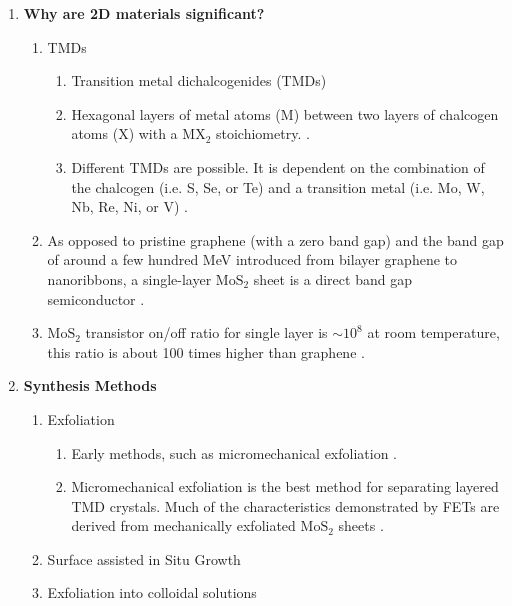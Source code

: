 \documentclass{article}
\begin{document}
\begin{enumerate}
\begin{enumerate}
		\end{enumerate} %
	\item{\textbf{Why are 2D materials significant?}}

		\begin{enumerate} %
			\item{TMDs}
				\begin{enumerate}
					\item{Transition metal dichalcogenides (TMDs)}
					\item{Hexagonal layers of metal atoms ($\mathrm{M}$) between two layers of chalcogen atoms ($\mathrm{X}$) with a $\mathrm{MX}_2$ stoichiometry. \cite{grapheneLike2Dreview2013}.}
					\item{Different TMDs are possible. It is dependent on the combination of the chalcogen (i.e. S, Se, or Te) and a transition metal (i.e. Mo, W, Nb, Re, Ni, or V) \cite{WilsonTMDs1969, grapheneLike2Dreview2013}.}
				\end{enumerate}
	
			\item{As opposed to pristine graphene (with a zero band gap) and the band gap of around a few hundred MeV introduced from bilayer graphene to nanoribbons, a single-layer $\mathrm{MoS}_2$ sheet is a direct band gap semiconductor \cite{grapheneLike2Dreview2013}. }
			\item{$\mathrm{MoS}_2$ transistor on/off ratio for single layer is $\sim 10^8$ at room temperature, this ratio is about 100 times higher than graphene \cite{grapheneLike2Dreview2013, novoselovEtAl2004}.}

		\end{enumerate} %

	\item{\textbf{Synthesis Methods}}
		\begin{enumerate} %
			\item{Exfoliation}
				\begin{enumerate}
					\item{Early methods, such as micromechanical exfoliation \cite{nanoscaleReview2011,acsnanoReview2013}.}
					\item{Micromechanical exfoliation is the best method for separating layered TMD crystals. Much of the characteristics demonstrated by FETs are derived from mechanically exfoliated $\mathrm{MoS}_2$ sheets \cite{grapheneLike2Dreview2013}.}
				\end{enumerate}
			\item{Surface assisted in Situ Growth}
			\item{Exfoliation into colloidal solutions}
		\end{enumerate} %


\end{enumerate}
\end{document}
